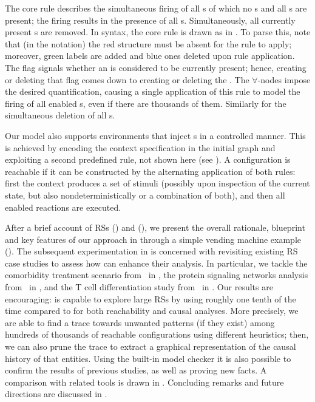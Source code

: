 The core rule describes the simultaneous firing of all s of which no s and all s are present; the firing results in the presence of all s. Simultaneously, all currently present s are removed. In \GROOVE syntax, the core rule is drawn as in .
To parse this, note that (in the \GROOVE notation) the red structure must be absent for the rule to apply; moreover, green labels are added and blue ones deleted upon rule application. The  flag signals whether an  is considered to be currently present; hence, creating or deleting that flag comes down to creating or deleting the . The $\forall$-nodes impose the desired quantification, causing a single application of this rule to model the firing of all enabled s, even if there are thousands of them.
Similarly for the simultaneous deletion of all s.

Our model also supports environments that inject s in a controlled manner. This is achieved by encoding the context specification in the initial graph and exploiting a second predefined rule, not shown here (see ). A configuration is reachable if it can be constructed by the alternating application of both rules: first the context produces a set of stimuli (possibly upon inspection of the current state, but also nondeterministically or a combination of both), and then all enabled reactions are executed.

After a brief account of RSs () and \GROOVE (), we present the overall rationale, blueprint and key features of our approach in  through a simple vending machine example ().
The subsequent experimentation in  is concerned with revisiting existing RS case studies to assess how \GROOVE can enhance their analysis. 
In particular, we tackle 
the comorbidity treatment scenario from~\cite{DBLP:conf/cmsb/BowlesBBFGM24} in , 
the protein signaling networks analysis from~\cite{DBLP:conf/cmsb/BallisBFO24} in , and
the T cell differentiation study from~\cite{datamod2023} in .
Our results are encouraging: \GROOVE is capable to explore large RSs 
by using roughly one tenth of the time compared to \BioResolve for both reachability and causal analyses.
More precisely, we are able to find a trace towards unwanted patterns (if they exist) among hundreds of thousands of reachable configurations using different heuristics; then, we can also prune the trace to extract a graphical representation of the causal history of that entities. Using the built-in model checker it is also possible to confirm the results of previous studies, as well as proving new facts.
A comparison with related tools is drawn in . Concluding remarks and future directions are discussed in .
